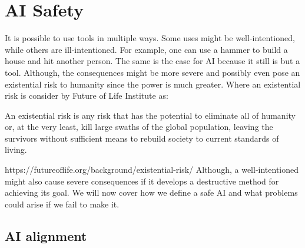 \documentclass[12pt,A4]{report}
\newcommand{\autobaj}{}
\theoremstyle{definition}
\begin{document}
\section{AI Safety}
It is possible to use tools in multiple ways. Some uses might be well-intentioned, while others are ill-intentioned. For example, one can use a hammer to build a house and hit another person. The same is the case for AI because it still is but a tool. Although, the consequences might be more severe and possibly even pose an existential risk to humanity since the power is much greater. Where an existential risk is consider by \autobaj{Future of Life Institute} as:
\begin{displayquote}
An existential risk is any risk that has the potential to eliminate all of humanity or, at the very least, kill large swaths of the global population, leaving the survivors without sufficient means to rebuild society to current standards of living.
\end{displayquote}
https://futureoflife.org/background/existential-risk/
Although, a well-intentioned might also cause severe consequences if it develops a destructive method for achieving its goal. We will now cover how we define a safe AI and what problems could arise if we fail to make it.


\subsection{AI alignment}
\end{document}
